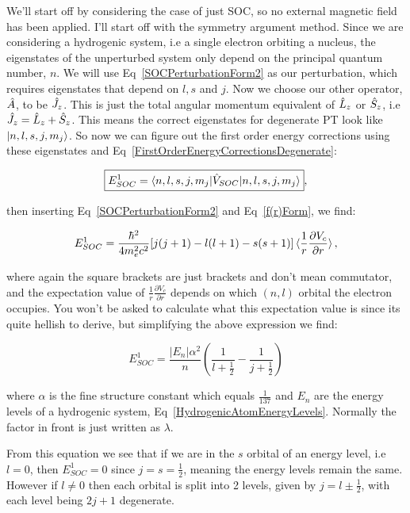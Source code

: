 We'll start off by considering the case of just SOC, so no external magnetic field has been applied. I'll start off with the symmetry argument method. Since we are considering a hydrogenic system, i.e a single electron orbiting a nucleus, the eigenstates of the unperturbed system only depend on the principal quantum number, $n$. We will use Eq~\ref{SOCPerturbationForm2} as our perturbation, which requires eigenstates that depend on $l, s$ and $j$. Now we choose our other operator, $\Hat{A}$, to be $\Hat{J}_z$. This is just the total angular momentum equivalent of $\Hat{L}_z$ or $\Hat{S}_z$, i.e $\Hat{J}_z = \Hat{L}_z + \Hat{S}_z$. This means the correct eigenstates for degenerate PT look like $\ket{n, l, s, j, m_j}$. So now we can figure out the first order energy corrections using these eigenstates and Eq~\ref{FirstOrderEnergyCorrectionsDegenerate}:

\begin{equation}
    \boxed{E^1_{SOC} = \braket{n, l, s, j, m_j | \Hat{V}_{SOC} | n, l, s, j, m_j}},
    \label{FirstOrderEnergySOC}
\end{equation}

\noindent then inserting Eq~\ref{SOCPerturbationForm2} and Eq~\ref{f(r)Form}, we find:

\begin{equation}
    E^1_{SOC} = \frac{\hbar^2}{4m^2_ec^2}[j(j + 1) -l(l + 1) - s(s + 1)] \braket{\frac{1}{r}\frac{\partial V_c}{\partial r}},
    \label{FirstOrderEnergySOCForm1}
\end{equation}

\noindent where again the square brackets are just brackets and don't mean commutator, and the expectation value of $\frac{1}{r} \frac{\partial V_c}{\partial r}$ depends on which $(n,l)$ orbital the electron occupies. You won't be asked to calculate what this expectation value is since its quite hellish to derive, but simplifying the above expression we find:

\begin{equation}
    E^1_{SOC} = \frac{|E_n| \alpha^2}{n}(\frac{1}{l + \frac{1}{2}} - \frac{1}{j + \frac{1}{2}})
    \label{FirstOrderEnergySOCForm2}
\end{equation}

\noindent where $\alpha$ is the fine structure constant which equals $\frac{1}{137}$ and $E_n$ are the energy levels of a hydrogenic system, Eq~\ref{HydrogenicAtomEnergyLevels}. Normally the factor in front is just written as $\lambda$.

\noindent From this equation we see that if we are in the $s$ orbital of an energy level, i.e $l = 0$, then $E^1_{SOC} = 0$ since $j = s = \frac{1}{2}$, meaning the energy levels remain the same. However if $l \neq 0$ then each orbital is split into 2 levels, given by $j = l \pm \frac{1}{2}$, with each level being $2j + 1$ degenerate.

